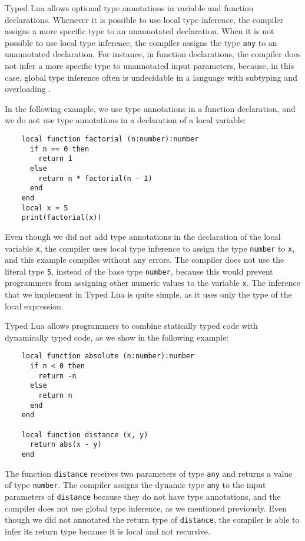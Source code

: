 Typed Lua allows optional type annotations in variable and function
declarations.
Whenever it is possible to use local type inference, the compiler
assigns a more specific type to an unannotated declaration.
When it is not possible to use local type inference, the compiler
assigns the type \texttt{any} to an unannotated declaration.
For instance, in function declarations, the compiler does not infer
a more specific type to unannotated input parameters, because,
in this case, global type inference often is undecidable in a
language with subtyping and overloading \citep{wells1999typability}.

In the following example, we use type annotations in a function
declaration, and we do not use type annotations in a declaration of a
local variable:
\begin{verbatim}
    local function factorial (n:number):number
      if n == 0 then
        return 1
      else
        return n * factorial(n - 1)
      end
    end
    local x = 5
    print(factorial(x))
\end{verbatim}

Even though we did not add type annotations in the declaration of
the local variable \texttt{x}, the compiler uses local type inference to
assign the type \texttt{number} to \texttt{x}, and this example compiles
without any errors.
The compiler does not use the literal type \texttt{5},
instead of the base type \texttt{number}, because this would prevent
programmers from assigning other numeric values to the variable
\texttt{x}.
The inference that we implement in Typed Lua is quite simple, as it
uses only the type of the local expression.

Typed Lua allows programmers to combine statically typed code with
dynamically typed code, as we show in the following example:
\begin{verbatim}
    local function absolute (n:number):number
      if n < 0 then
        return -n
      else
        return n
      end
    end

    local function distance (x, y)
      return abs(x - y)
    end
\end{verbatim}

The function \texttt{distance} receives two parameters of type \texttt{any}
and returns a value of type \texttt{number}.
The compiler assigns the dynamic type \texttt{any} to the input
parameters of \texttt{distance} because they do not have type annotations,
and the compiler does not use global type inference, as we mentioned
previously.
Even though we did not annotated the return type of \texttt{distance},
the compiler is able to infer its return type because it is local
and not recursive.

